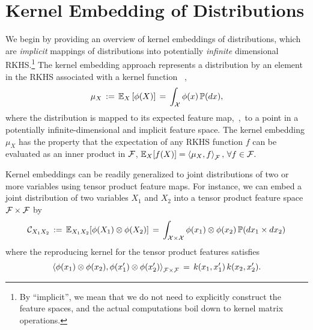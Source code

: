 \documentclass[11pt]{article}
\begin{document}
%



\section{Kernel Embedding of Distributions}
\label{sec:embedding}

We begin by providing an overview of kernel embeddings of distributions, which are \emph{implicit} mappings of distributions into potentially \emph{infinite} dimensional RKHS.\footnote{By ``implicit'', we mean that we do not need to explicitly construct the feature spaces, and the actual computations boil down to kernel matrix operations.} The kernel embedding approach represents a distribution by an element in the RKHS associated with a kernel function \, \cite{SmoGreSonSch07,SriGreFukLanetal08},
\begin{align}
  \mu_{X} \, := \, \mathbb{E}_{X} \left[\phi(X)\right] \, = \, \int_{\mathcal{X}} \phi(x) \, \mathbb{P}(dx),  \label{eq:embedding}
\end{align}
where the distribution is mapped to its expected feature map,~\ie,~to a point in a potentially infinite-dimensional and implicit feature space.
 The kernel embedding $\mu_{X}$ has the property that the expectation of any RKHS function $f$ can be evaluated as an inner product in $\mathcal{F}$,
$
  \mathbb{E}_{X} [f(X)] = \left\langle \mu_{X},f \right\rangle_{\mathcal{F}}, \, \forall f\in\mathcal{F}.
$

Kernel embeddings can be readily generalized to joint distributions of two or more variables using tensor product feature maps. For instance, we can embed a joint distribution of two variables $X_1$ and $X_2$ into a tensor product feature space $\mathcal{F}\times \mathcal{F}$ by
\begin{align}
    \mathcal{C}_{X_1X_2} \, := \, \mathbb{E}_{X_1X_2}[\phi(X_1)\otimes \phi(X_2)] \, = \, \int_{\mathcal{X} \times \mathcal{X}} \phi(x_1) \otimes \phi(x_2) \, \mathbb{P}(dx_1 \times dx_2)
\end{align}
where the reproducing kernel for the tensor product features satisfies
\[
	\left\langle \phi(x_1)\otimes \phi(x_2) ,\phi(x_1')\otimes \phi(x_2')  \right\rangle_{\mathcal{F}\times \mathcal{F}} \, = \,  k(x_1,x_1')\,k(x_2,x_2').
\]
\end{document}
